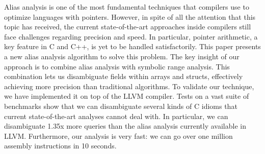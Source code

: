 Alias analysis is one of the most fundamental techniques that
compilers use to optimize languages with pointers.
However, in spite of all the attention that this topic has received, the current
state-of-the-art approaches inside compilers still face challenges regarding
precision and speed.
In particular, pointer arithmetic, a key feature in C and C++, is yet to be
handled satisfactorily.
This paper presents a new alias analysis algorithm to solve this problem.
The key insight of our approach is to combine alias analysis with symbolic
range analysis.
This combination lets us disambiguate fields within arrays and structs,
effectively achieving more precision than traditional algorithms.
To validate our technique, we have implemented it on top of the LLVM compiler.
Tests on a vast suite of benchmarks show that we can disambiguate several
kinds of C idioms that current state-of-the-art analyses cannot deal with.
In particular, we can disambiguate 1.35x more queries than the alias analysis
currently available in LLVM.
Furthermore, our analysis is very fast: we can go over one million assembly
instructions in 10 seconds.

